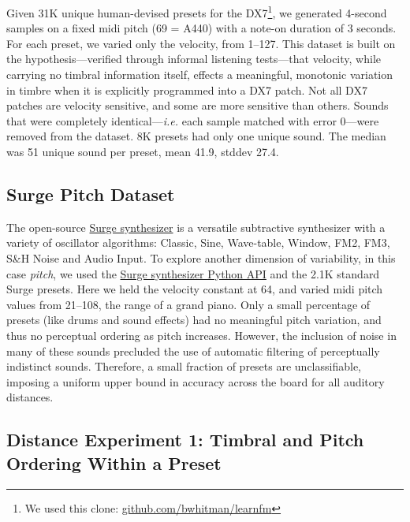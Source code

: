Given 31K unique human-devised presets for the DX7\footnote{We used this clone: \url{github.com/bwhitman/learnfm}}, we generated 4-second samples on a fixed midi pitch (69 = A440) with a note-on duration of 3 seconds. For each preset, we varied only the velocity, from 1--127. This dataset is built on the hypothesis---verified through informal listening tests---that velocity, while carrying no timbral information itself, effects a meaningful, monotonic variation in timbre when it is explicitly programmed into a DX7 patch. Not all DX7 patches are velocity sensitive, and some are more sensitive than others. Sounds that were completely identical---{\em i.e.} each sample matched with error 0---were removed from the dataset. 8K presets had only one unique sound. The median was 51 unique sound per preset, mean 41.9, stddev 27.4.

\subsection{Surge Pitch Dataset}
\label{sec:surge}

The open-source \href{https://surge-synthesizer.github.io/}{Surge synthesizer} is a versatile subtractive synthesizer with a variety of oscillator algorithms: Classic, Sine, Wave-table, Window, FM2, FM3, S\&H Noise and Audio Input. To explore another dimension of variability, in this case {\em pitch}, we used the \href{https://github.com/surge-synthesizer/surge-python}{Surge synthesizer Python API} and the 2.1K standard Surge presets. Here we held the velocity constant at 64, and varied midi pitch values from 21--108, the range of a grand piano. Only a small percentage of presets (like drums and sound effects) had no meaningful pitch variation, and thus no perceptual ordering as pitch increases. However, the inclusion of noise in many of these sounds precluded the use of automatic filtering of perceptually indistinct sounds. Therefore, a small fraction of presets are unclassifiable, imposing a uniform upper bound in accuracy across the board for all auditory distances.

\subsection{Distance Experiment 1: Timbral and Pitch Ordering Within a Preset}
\label{sec:experiment1}

